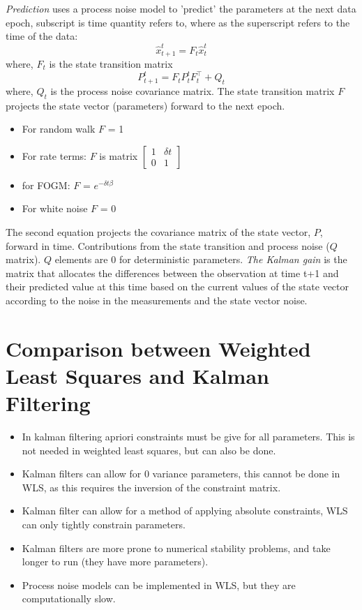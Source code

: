 \textit{Prediction} {uses a process noise model} to 'predict' the parameters at the next data epoch, subscript is time quantity refers to, where as the superscript refers to the time of the data:
\begin{equation}
    \hat{x}_{t+1}^t = F_t \hat{x}_t^t
\end{equation}
where, $F_t$ is the state transition matrix
\begin{equation}
    P_{t+1}^t = F_t P_t^t F_t^\intercal + Q_t
\end{equation}
where, $Q_t$ is the process noise covariance matrix.
The state transition matrix $F$ projects the state vector (parameters) forward to the next epoch.
\begin{itemize}
    \item For random walk $F$ = 1
    \item For rate terms: $F$ is matrix 
    $\begin{bmatrix}
    1 & \delta t\\
    0 & 1
  \end{bmatrix}$
    \item for FOGM: $F$ = $e^{-\delta t \beta}$
    \item For white noise $F$ = 0
\end{itemize}
The second equation projects the covariance matrix of the state vector, $P$, forward in time. Contributions from the state transition and process noise ($Q$ matrix). 
$Q$ elements are 0 for deterministic parameters.
%
\textit{The Kalman gain} {is the matrix} that allocates the differences between the observation at time t+1 and their predicted value at this time based on the current values of the state vector according to the noise in the measurements and the state vector noise.

\section{Comparison between Weighted Least Squares and Kalman Filtering}

\begin{itemize}
    \item In kalman filtering apriori constraints must be give for all parameters. This is not needed in weighted least squares, but can also be done.
    \item Kalman filters can allow for 0 variance parameters, this cannot be done in WLS, as this requires the inversion of the constraint matrix.
    \item Kalman filter can allow for a method of applying absolute constraints, WLS can only tightly constrain parameters.
    \item Kalman filters are more prone to numerical stability problems, and take longer to run (they have more parameters).
    \item Process noise models can be implemented in WLS, but they are computationally slow.
\end{itemize}

